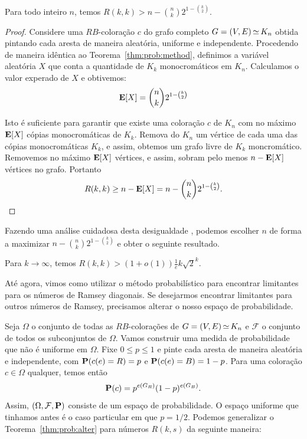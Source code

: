 \begin{theorem}
\label{thm:prob:alter}
Para todo inteiro $n$, temos $\displaystyle R(k,k) > n - \binom{n}{k}2^{1 - \binom{k}{2}}$.
\end{theorem}
\begin{proof}
Considere uma $RB$-coloração $c$ do grafo completo $G = (V,E) \operatorname{\simeq} K_n$ obtida pintando cada aresta de maneira aleatória, uniforme e independente. Procedendo de maneira idêntica ao Teorema~\ref{thm:prob:method}, definimos a variável aleatória $X$ que conta a quantidade de $K_k$ monocromáticos em $K_n$. Calculamos o valor experado de $X$ e obtivemos:
\[ \operatorname{\mathbf{E}}[X] = \binom{n}{k} 2^{1 - \binom{k}{2}} \]

Isto é suficiente para garantir que existe uma coloração $c$ de $K_n$ com no máximo $\operatorname{\mathbf{E}}[X]$ cópias monocromáticas de $K_k$. Remova do $K_n$ um vértice de cada uma das cópias monocromáticas $K_k$, e assim, obtemos um grafo livre de $K_k$ moncromático. Removemos no máximo $\operatorname{\mathbf{E}}[X]$ vértices, e assim, sobram pelo menos $n - \operatorname{\mathbf{E}}[X]$ vértices no grafo. Portanto
\[ R(k,k) \geq n - \operatorname{\mathbf{E}}[X] = n - \binom{n}{k} 2^{1 - \binom{k}{2}}.  \qedhere\]
\end{proof}

Fazendo uma análise cuidadosa desta desigualdade \cite{spencer2014asymptopia}, podemos escolher $n$ de forma a maximizar $n - \binom{n}{k}2^{1 - \binom{k}{2}}$ e obter o seguinte resultado.

\begin{noproofcorollary}
Para $k \to \infty$, temos $\displaystyle R(k,k) > (1+o(1))\frac{1}{e}k\sqrt{2}^k$.
\end{noproofcorollary}

Até agora, vimos como utilizar o método probabilístico para encontrar limitantes para os números de Ramsey diagonais. Se desejarmos encontrar limitantes para outros números de Ramsey, precisamos alterar o nosso espaço de probabilidade.

Seja $\Omega$ o conjunto de todas as $RB$-colorações de $G = (V,E) \operatorname{\simeq} K_n$ e $\mathcal{F}$ o conjunto de todos os subconjuntos de $\Omega$. Vamos construir uma medida de probabilidade que não é uniforme em $\Omega$. Fixe $0 \leq p \leq 1$ e pinte cada aresta de maneira aleatória e independente, com $\operatorname{\mathbf{P}}(c(e) = R) = p$ e $\operatorname{\mathbf{P}}(c(e) = B) = 1 - p$. Para uma coloração $c \in \Omega$ qualquer, temos então
\[ \operatorname{\mathbf{P}}(c) =  p^{e(G_R)}(1-p)^{e(G_B)}.\]
Assim, $(\Omega, \mathcal{F}, \operatorname{\mathbf{P}})$ consiste de um espaço de probabilidade. O espaço uniforme que tinhamos antes é o caso particular em que $p = 1/2$. Podemos generalizar o Teorema~\ref{thm:prob:alter} para números $R(k,s)$ da seguinte maneira:

